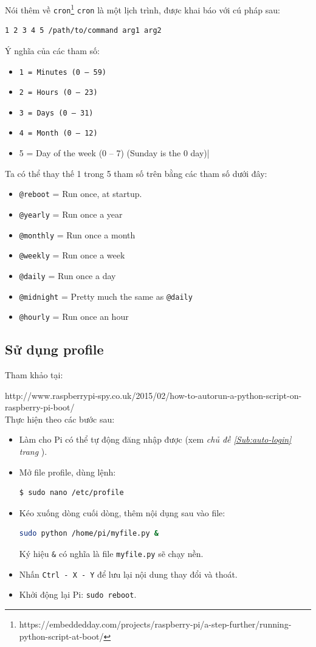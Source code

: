 Nói thêm về \verb|cron|\footnote{\textsf{https://embeddedday.com/projects/raspberry-pi/a-step-further/running-python-script-at-boot/}} \verb|cron| là một lịch trình, được khai báo với cú pháp sau:
\begin{lstlisting}[language=bash]
1 2 3 4 5 /path/to/command arg1 arg2
\end{lstlisting}
Ý nghĩa của các tham số:
\begin{itemize}
\item \verb|1 = Minutes (0 – 59)|
\item \verb|2 = Hours (0 – 23)|
\item \verb|3 = Days (0 – 31)|
\item \verb|4 = Month (0 – 12)|
\item 5 = Day of the week (0 – 7) (Sunday is the 0 day)|
\end{itemize}
Ta có thể thay thế 1 trong 5 tham số trên bằng các tham số dưới đây:
\begin{itemize}
\item \verb|@reboot|	= Run once, at startup.
\item \verb|@yearly|	= Run once a year
\item \verb|@monthly| = Run once a month
\item \verb|@weekly|	= Run once a week
\item \verb|@daily| = Run once a day
\item \verb|@midnight| = Pretty much the same as \verb|@daily|
\item \verb|@hourly|	= Run once an hour
\end{itemize}
\subsection{Sử dụng profile}
Tham khảo tại:

\textsf{http://www.raspberrypi-spy.co.uk/2015/02/how-to-autorun-a-python-script-on-raspberry-pi-boot/}\\

Thực hiện theo các bước sau:
\begin{itemize}
\item Làm cho Pi có thể tự động đăng nhập được (xem \textit{chủ đề \ref{Sub:auto-login} trang \pageref{Sub:auto-login}}).
\item Mở file profile, dùng lệnh: 
\begin{lstlisting}[language=bash]
$ sudo nano /etc/profile
\end{lstlisting}
\item Kéo xuống dòng cuối dòng, thêm nội dụng sau vào file:
\begin{lstlisting}[language=bash]
sudo python /home/pi/myfile.py &
\end{lstlisting}
Ký hiệu \verb|&| có nghĩa là file \verb|myfile.py| sẽ chạy nền.
\item Nhấn \verb|Ctrl - X - Y| để lưu lại nội dung thay đổi và thoát.
\item Khởi động lại Pi: \verb|sudo reboot|.
\end{itemize}
